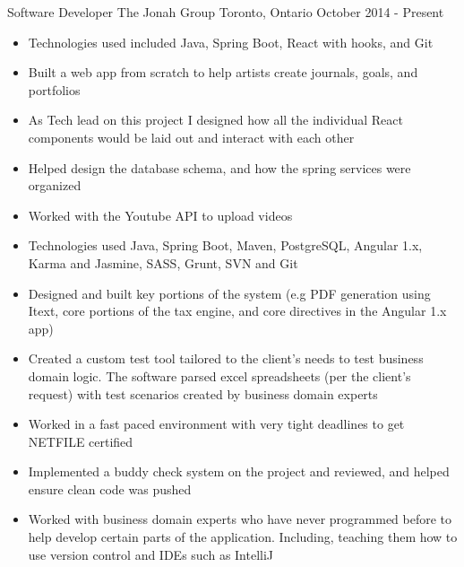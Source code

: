 
\begin{cventries}
    \cventry
    {Software Developer}
    {The Jonah Group}
    {Toronto, Ontario}
    {October 2014 - Present}
    {
        \renewcommand{\labelitemii}{\bullet}
        \begin{cvitems}
            \item[] {
                \begin{itemize}
                    \item {Technologies used included Java, Spring Boot, React with hooks, and Git}
                    \item {Built a web app from scratch to help artists create journals, goals, and portfolios}
                    \item {As Tech lead on this project I designed how all the individual React components would be laid out and interact with each other}
                    \item {Helped design the database schema, and how the spring services were organized}
                    \item {Worked with the Youtube API to upload videos}
                \end{itemize}
            }
            \item[] {
                \begin{itemize}
                    \item {Technologies used Java, Spring Boot, Maven, PostgreSQL, Angular 1.x, Karma and Jasmine, SASS, Grunt, SVN and Git}
                    \item {Designed and built key portions of the system (e.g PDF generation using Itext, core portions of the tax engine, and core directives in the Angular 1.x app)}
                    \item {Created a custom test tool tailored to the client’s needs to test business domain logic. The software parsed excel spreadsheets
                            (per the client’s request) with test scenarios created by business domain experts}
                    \item {Worked in a fast paced environment with very tight deadlines to get NETFILE certified}
                    \item {Implemented a buddy check system on the project and reviewed, and helped ensure clean code was pushed}
                    \item {Worked with business domain experts who have never programmed before to help develop certain parts of the application. Including, teaching them how to use version control and IDEs such as IntelliJ}

\end{itemize}}
\end{cvitems}}
\end{cventries}
